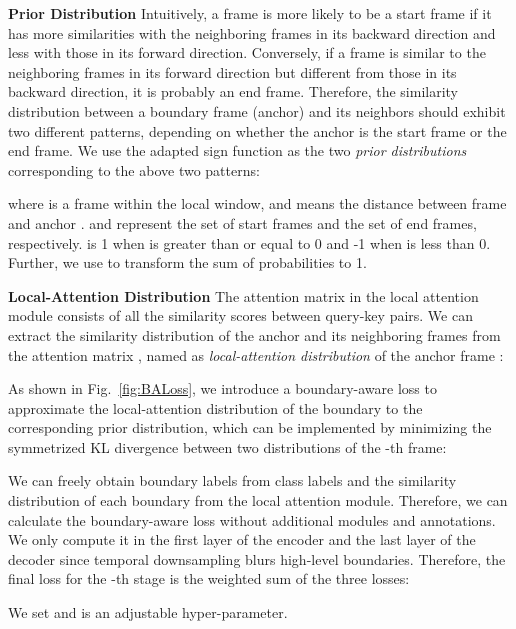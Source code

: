 \documentclass[letterpaper]{article} \usepackage[submission]{aaai23}  \usepackage{times}  \usepackage{helvet}  \usepackage{courier}  \usepackage[hyphens]{url}  \usepackage{graphicx} \urlstyle{rm} \def\UrlFont{\rm}  \usepackage{natbib}  \usepackage{caption} \frenchspacing  \setlength{\pdfpagewidth}{8.5in} \setlength{\pdfpageheight}{11in} \usepackage{algorithm}
\begin{document}
\textbf{Prior Distribution}\quad 
Intuitively, a frame is more likely to be a start frame if it has more similarities with the neighboring frames in its backward direction and less with those in its forward direction. Conversely, if a frame is similar to the neighboring frames in its forward direction but different from those in its backward direction, it is probably an end frame. Therefore, the similarity distribution between a boundary frame  (anchor) and its neighbors should exhibit two different patterns, depending on whether the anchor is the start frame or the end frame. We use the adapted sign function as the two {\em prior distributions} corresponding to the above two patterns:
\begin{footnotesize}

\end{footnotesize}
where  is a frame within the local window, and  means the distance between frame  and anchor .  and  represent the set of start frames and the set of end frames, respectively.  is 1 when  is greater than or equal to 0 and -1 when  is less than 0. Further, we use  to transform the sum of probabilities to 1.

\textbf{Local-Attention Distribution}\quad 
The attention matrix in the local attention module consists of all the similarity scores between query-key pairs. We can extract the similarity distribution of the anchor and its neighboring frames from the attention matrix , named as {\em local-attention distribution} of the anchor frame :
\begin{footnotesize}

\end{footnotesize}
As shown in Fig.~\ref{fig:BALoss}, we introduce a boundary-aware loss to approximate the local-attention distribution of the boundary to the corresponding prior distribution, which can be implemented by minimizing the symmetrized KL divergence between two distributions of the -th frame:

We can freely obtain boundary labels from class labels and the similarity distribution of each boundary from the local attention module. Therefore, we can calculate the boundary-aware loss without additional modules and annotations. We only compute it in the first layer of the encoder and the last layer of the decoder since temporal downsampling blurs high-level boundaries. Therefore, the final loss for the -th stage is the weighted sum of the three losses:

We set  and  is an adjustable hyper-parameter.
\end{document}

